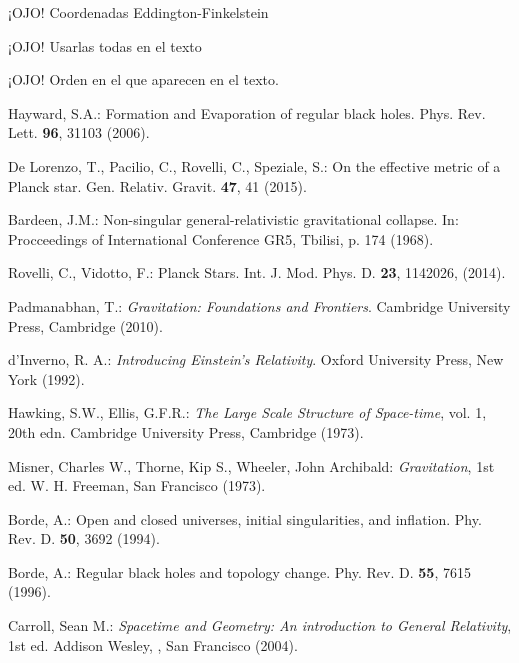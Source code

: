 \documentclass[prb,aps,preprintnumbers,amsmath,amssymb]{article}
\numberwithin{equation}{section}
\begin{document}
¡OJO! Coordenadas Eddington-Finkelstein\\


\begin{thebibliography}{10}

 ¡OJO! Usarlas todas en el texto

 ¡OJO! Orden en el que aparecen en el texto.

 Hayward, S.A.: Formation and Evaporation of regular black holes. Phys. Rev. Lett. \textbf{96}, 31103 (2006).

 De Lorenzo, T., Pacilio, C., Rovelli, C., Speziale, S.: On the effective metric of a Planck star. Gen. Relativ. Gravit. \textbf{47}, 41 (2015).

 Bardeen, J.M.: Non-singular general-relativistic gravitational collapse. In: Procceedings of International Conference GR5, Tbilisi, p. 174 (1968).

 Rovelli, C., Vidotto, F.: Planck Stars. Int. J. Mod. Phys. D. \textbf{23}, 1142026, (2014).


 Padmanabhan, T.: \textit{Gravitation: Foundations and Frontiers}. Cambridge University Press, Cambridge (2010).

 d'Inverno, R. A.: \textit{Introducing Einstein's Relativity}. Oxford University Press, New York (1992).

 Hawking, S.W., Ellis, G.F.R.: \textit{The Large Scale Structure of Space-time}, vol. 1, 20th edn. Cambridge University Press, Cambridge (1973).

 Misner, Charles W., Thorne, Kip S., Wheeler, John Archibald: \textit{Gravitation}, 1st ed. W. H. Freeman, San Francisco (1973).

 Borde, A.: Open and closed universes, initial singularities, and inflation. Phy. Rev. D. \textbf{50}, 3692 (1994).

 Borde, A.: Regular black holes and topology change. Phy. Rev. D. \textbf{55}, 7615 (1996).

 Carroll, Sean M.: \textit{Spacetime and Geometry: An introduction to General Relativity}, 1st ed. Addison Wesley, , San Francisco (2004). 

\end{thebibliography}
\end{document}

